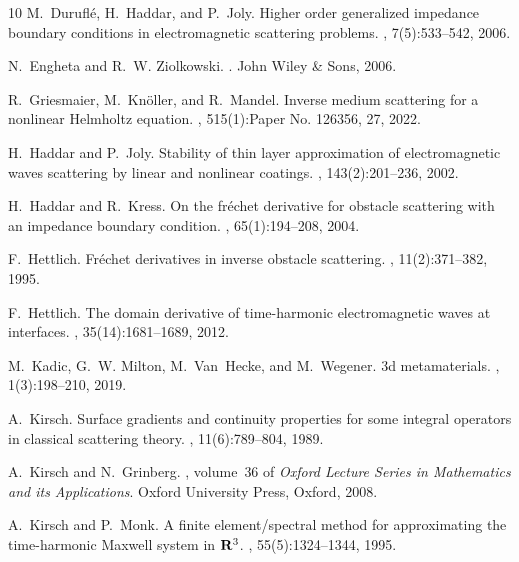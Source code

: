 \documentclass[12pt,reqno]{amsart}
\theoremstyle{definition}
\numberwithin{equation}{section}
\begin{document}
\begin{thebibliography}{10}
M.~Durufl{\'e}, H.~Haddar, and P.~Joly.
\newblock Higher order generalized impedance boundary conditions in
  electromagnetic scattering problems.
, 7(5):533--542, 2006.

N.~Engheta and R.~W. Ziolkowski.
.
\newblock John Wiley \& Sons, 2006.

R.~Griesmaier, M.~Kn\"{o}ller, and R.~Mandel.
\newblock Inverse medium scattering for a nonlinear {H}elmholtz equation.
, 515(1):Paper No. 126356, 27, 2022.

H.~Haddar and P.~Joly.
\newblock Stability of thin layer approximation of electromagnetic waves
  scattering by linear and nonlinear coatings.
, 143(2):201--236, 2002.

H.~Haddar and R.~Kress.
\newblock On the fr\'echet derivative for obstacle scattering with an impedance
  boundary condition.
, 65(1):194--208, 2004.

F.~Hettlich.
\newblock Fr\'{e}chet derivatives in inverse obstacle scattering.
, 11(2):371--382, 1995.

F.~Hettlich.
\newblock The domain derivative of time-harmonic electromagnetic waves at
  interfaces.
, 35(14):1681--1689, 2012.

M.~Kadic, G.~W. Milton, M.~Van~Hecke, and M.~Wegener.
\newblock 3d metamaterials.
, 1(3):198--210, 2019.

A.~Kirsch.
\newblock Surface gradients and continuity properties for some integral
  operators in classical scattering theory.
, 11(6):789--804, 1989.

A.~Kirsch and N.~Grinberg.
, volume~36 of
  {\em Oxford Lecture Series in Mathematics and its Applications}.
\newblock Oxford University Press, Oxford, 2008.

A.~Kirsch and P.~Monk.
\newblock A finite element/spectral method for approximating the time-harmonic
  {M}axwell system in {${\bf R}^3$}.
, 55(5):1324--1344, 1995.


\end{thebibliography}
\end{document}
